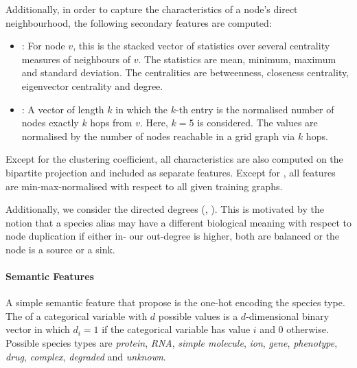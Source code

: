 \documentclass[
	fontsize=10pt, %
	twoside=false, %
	secnumdepth=1, %
  toc=indentunnumbered %
]{kaobook}
\begin{document}
Additionally, in order to capture the characteristics of a node's direct
neighbourhood, the following secondary features are computed:
\begin{itemize}
\item {}: For node $v$, this is the stacked
  vector of statistics over several centrality measures of neighbours of $v$.
  The statistics are mean, minimum, maximum and standard deviation. The
  centralities are betweenness, closeness centrality, eigenvector centrality and degree.
\item {}: A vector of length $k$ in which the $k$-th
  entry is the normalised number of nodes exactly $k$ hops from $v$. Here, $k=5$
  is considered. The values are normalised by the number of nodes reachable in a
  grid graph via $k$ hops.
\end{itemize}

Except for the clustering coefficient, all characteristics are also
computed on the bipartite projection and included as separate features.
Except for , all features are min-max-normalised
with respect to all given training graphs.


Additionally, we consider the directed degrees (,
). This is motivated by the notion that a species alias may
have a different biological meaning with respect to node duplication if either in- our
out-degree is higher, both are balanced or the node is a source or a sink.




\paragraph{Semantic Features}

A simple semantic feature that \citeauthor{nielsen_MachineLearningSupport_2019}
propose is the one-hot encoding the species type.
The  of a categorical variable with $d$ possible values is
a $d$-dimensional binary vector in which $d_i = 1$ if the categorical variable has
value $i$ and $0$ otherwise.
Possible species types are
\textit{protein}, \textit{RNA}, \textit{simple molecule}, \textit{ion},
\textit{gene}, \textit{phenotype}, \textit{drug}, \textit{complex},
\textit{degraded} and \textit{unknown}. 
\end{document}
